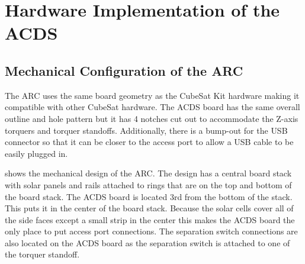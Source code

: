 
\chapter{Hardware Implementation of the \acf{ACDS}}

\label{ch:CubeSatHardware}

\section{Mechanical Configuration of the \acf{ARC}}

The \ac{ARC} uses the same board geometry as the CubeSat Kit\cite{CSK} hardware making it compatible with other CubeSat hardware. The \ac{ACDS} board has the same overall outline and hole pattern but it has 4 notches cut out to accommodate the Z-axis torquers and torquer standoffs. Additionally, there is a bump-out for the \ac{USB} connector so that it can be closer to the access port to allow a \ac{USB} cable to be easily plugged in.

 shows the mechanical design of the \ac{ARC}. The design has a central board stack with solar panels and rails attached to rings that are on the top and bottom of the board stack. The \ac{ACDS} board is located 3rd from the bottom of the stack. This puts it in the center of the board stack. Because the solar cells cover all of the side faces except a small strip in the center this makes the \ac{ACDS} board the only place to put access port connections. The separation switch connections are also located on the \ac{ACDS} board as the separation switch is attached to one of the torquer standoff.

